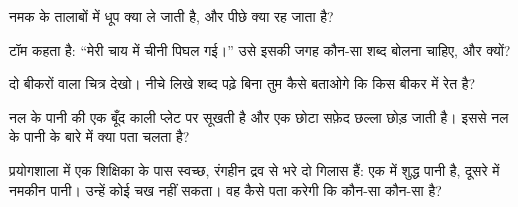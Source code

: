\begin{exercise}[$\star$]\label{exo:g2:mixing-and-dissolving:7}
नमक के तालाबों में धूप क्या ले जाती है, और पीछे क्या
रह जाता है?
\end{exercise}

\begin{exercise}[$\star$]\label{exo:g2:mixing-and-dissolving:8}
टॉम कहता है: ``मेरी चाय में चीनी पिघल गई।'' उसे इसकी जगह कौन-सा शब्द
बोलना चाहिए, और क्यों?
\end{exercise}

\begin{exercise}[$\star\star$]\label{exo:g2:mixing-and-dissolving:9}
दो बीकरों वाला चित्र देखो। नीचे लिखे शब्द पढ़े बिना तुम कैसे बताओगे
कि किस बीकर में रेत है?
\end{exercise}

\begin{exercise}[$\star\star$]\label{exo:g2:mixing-and-dissolving:10}
नल के पानी की एक बूँद काली प्लेट पर सूखती है और एक छोटा सफ़ेद छल्ला
छोड़ जाती है। इससे नल के पानी के बारे में क्या पता चलता है?
\end{exercise}

\begin{exercise}[$\star\star$]\label{exo:g2:mixing-and-dissolving:11}
प्रयोगशाला में एक शिक्षिका के पास स्वच्छ, रंगहीन द्रव से भरे दो गिलास हैं:
एक में शुद्ध पानी है, दूसरे में नमकीन पानी। उन्हें कोई चख नहीं सकता।
वह कैसे पता करेगी कि कौन-सा कौन-सा है?
\end{exercise}
